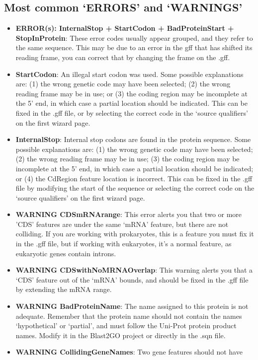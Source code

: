 \subsection{Most common `ERRORS' and `WARNINGS'}
\begin{itemize}
 \item \textbf{ERROR(s): InternalStop + StartCodon + BadProteinStart +
 StopInProtein}: These error codes usually appear grouped, and they refer to
 the same sequence. This may be due to an error in the gff that has shifted its
 reading frame, you can correct that by changing the frame on the .gff.
 \item \textbf{StartCodon}: An illegal start codon was used. Some possible
 explanations are: (1) the wrong genetic code may have been selected; (2)
 the wrong reading frame may be in use; or (3) the coding region may be
 incomplete at the 5' end, in which case a partial location should be indicated.
 This can be fixed in the .gff file, or by selecting the correct code in the
 `source qualifiers' on the first wizard page.
 \item \textbf{InternalStop}: Internal stop codons are found in the protein
 sequence. Some possible explanations are: (1) the wrong genetic code may have
 been selected; (2) the wrong reading frame may be in use; (3) the coding region
 may be incomplete at the 5' end, in which case a partial location should be
 indicated; or (4) the CdRegion feature location is incorrect. This can be fixed
 in the .gff file by modifying the start of the sequence or selecting the
 correct code on the `source qualifiers' on the first wizard page.
 \item \textbf{WARNING CDSmRNArange}: This error alerts you that two or more
 'CDS' features are under the same `mRNA' feature, but there are not colliding.
 If you are working with prokaryotes, this is a feature you must fix it in the
 .gff file, but if working with eukaryotes, it's a normal feature, as eukaryotic
 genes contain introns.
 \item \textbf{WARNING CDSwithNoMRNAOverlap}: This warning alerts you that
 a `CDS' feature out of the `mRNA' bounds, and should be fixed in the .gff
 file by extending the mRNA range.
 \item \textbf{WARNING BadProteinName}: The name assigned to this protein is
 not adequate. Remember that the protein name should not contain the names
 `hypothetical' or `partial', and must follow the Uni-Prot protein product
 names. Modify it in the Blast2GO project or directly in the .sqn file.
 \item \textbf{WARNING CollidingGeneNames}: Two gene features should not have

\end{itemize}
